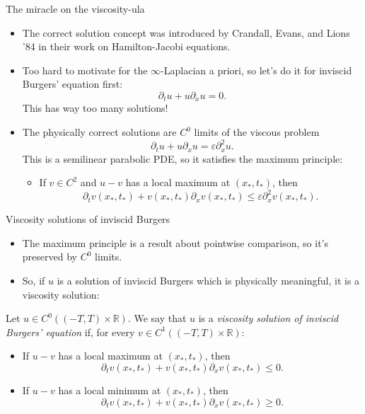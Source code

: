 \documentclass[10pt]{beamer}
\newcommand{\RR}{\mathbb{R}}
\begin{document}
\begin{frame}{The miracle on the viscosity-ula}
\begin{itemize}
\item The correct solution concept was introduced by Crandall, Evans, and Lions '84 in their work on Hamilton-Jacobi equations. 
\item Too hard to motivate for the $\infty$-Laplacian a priori, so let's do it for inviscid Burgers' equation first:
$$\partial_t u + u \partial_x u = 0.$$
This has way too many solutions!  
\item The physically correct solutions are $C^0$ limits of the viscous problem 
$$\partial_t u + u \partial_x u = \varepsilon \partial_x^2 u.$$
This is a semilinear parabolic PDE, so it satisfies the maximum principle: 
\begin{itemize}
\item If $v \in C^2$ and $u - v$ has a local maximum at $(x_*, t_*)$, then
$$\partial_t v(x_*, t_*) + v(x_*, t_*) \partial_x v(x_*, t_*) \leq \varepsilon \partial_x^2 v(x_*, t_*).$$
\end{itemize}
\end{itemize}
\end{frame}

\begin{frame}{Viscosity solutions of inviscid Burgers}
\begin{itemize}
\item The maximum principle is a result about pointwise comparison, so it's preserved by $C^0$ limits. 
\item So, if $u$ is a solution of inviscid Burgers which is physically meaningful, it is a viscosity solution: 
\end{itemize}

\begin{definition}
Let $u \in C^0((-T, T) \times \RR)$. We say that $u$ is a \emph{viscosity solution of inviscid Burgers' equation} if, for every $v \in C^1((-T, T) \times \RR)$:  
\begin{itemize}
\item If $u - v$ has a local maximum at $(x_*, t_*)$, then
$$\partial_t v(x_*, t_*) + v(x_*, t_*) \partial_x v(x_*, t_*) \leq 0.$$
\item If $u - v$ has a local minimum at $(x_*, t_*)$, then 
$$\partial_t v(x_*, t_*) + v(x_*, t_*) \partial_x v(x_*, t_*) \geq 0.$$
\end{itemize}
\end{definition}
\end{frame}
\end{document}
